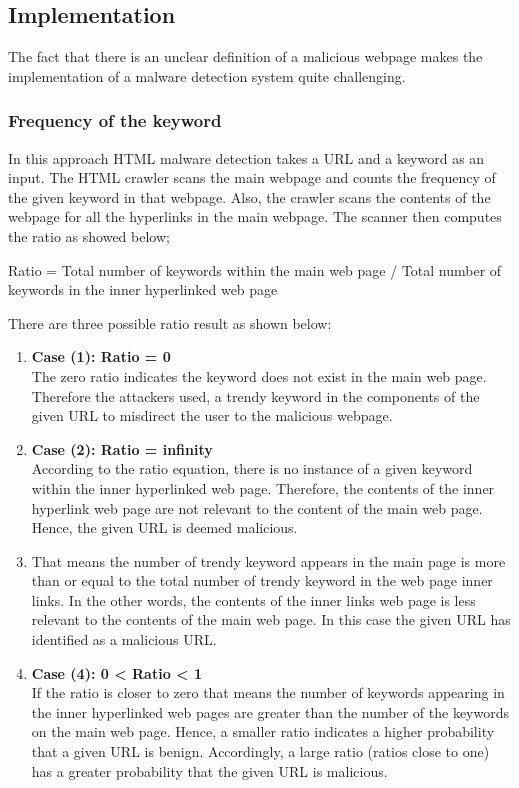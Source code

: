 
\subsection{Implementation}
The fact that there is an unclear definition of a malicious webpage makes the implementation of a malware detection system quite challenging. 	  
	

\subsubsection{Frequency of the keyword}
 
In this approach HTML malware detection takes a URL and a keyword as an input. The HTML crawler scans the main webpage and counts the frequency of the given keyword in that webpage. Also, the crawler scans the contents of the webpage for all the hyperlinks in the main webpage. The scanner then computes the ratio as showed below;

Ratio = Total number of keywords within the main web page / Total number of keywords in the inner hyperlinked web page 

There are three possible ratio result as shown below:
\begin{enumerate}
\item 
{\bf Case (1): Ratio = 0}\\
The zero ratio indicates the keyword does not exist in the main web page. Therefore the attackers used, a trendy keyword in the components of the given URL to misdirect the user to the malicious webpage. 
\item
{\bf Case (2): Ratio = infinity}\\
According to the ratio equation, there is no instance of a given keyword within the inner hyperlinked web page. Therefore, the contents of the inner hyperlink web page are not relevant to the content of the main web page. Hence, the given URL is deemed malicious.
\item
That means the number of trendy keyword appears in the main page is more than or equal to the total number of trendy keyword in the web page inner links. In the other words, the contents of the inner links web page is less relevant to the contents of the main web page. In this case the given URL has identified as a malicious URL. 
\item
{\bf Case (4): 0 < Ratio < 1}\\
If the ratio is closer to zero that means the number of keywords appearing in the inner hyperlinked web pages are greater than the number of the keywords on the main web page. Hence, a smaller ratio indicates a higher probability that a given URL is benign. Accordingly, a large ratio (ratios close to one) has a greater probability that the given URL is malicious.
\end{enumerate}
